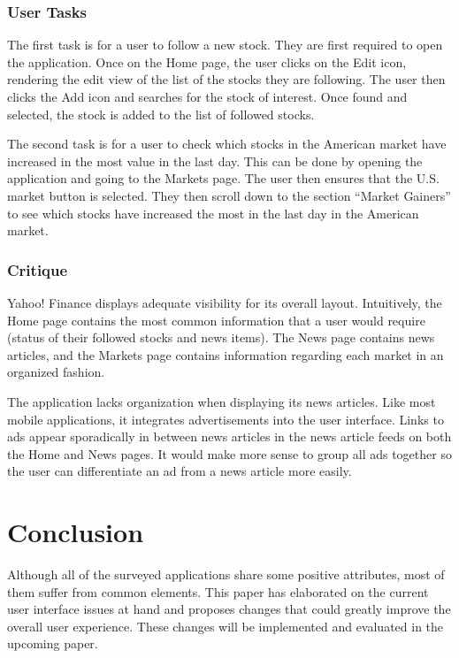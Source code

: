 \documentclass{sigchi}
\begin{document}
\subsubsection{User Tasks}
The first task is for a user to follow a new stock. They are first required to open the application. Once on the Home page, the user clicks on the Edit icon, rendering the edit view of the list of the stocks they are following. The user then clicks the Add icon and searches for the stock of interest. Once found and selected, the stock is added to the list of followed stocks.\par

The second task is for a user to check which stocks in the American market have increased in the most value in the last day. This can be done by opening the application and going to the Markets page. The user then ensures that the U.S. market button is selected. They then scroll down to the section ``Market Gainers'' to see which stocks have increased the most in the last day in the American market.


\subsubsection{Critique}
Yahoo! Finance displays adequate visibility for its overall layout. Intuitively, the Home page contains the most common information that a user would require (status of their followed stocks and news items). The News page contains news articles, and the Markets page contains information regarding each market in an organized fashion. \par

The application lacks organization when displaying its news articles. Like most mobile applications, it integrates advertisements into the user interface. Links to ads appear sporadically in between news articles in the news article feeds on both the Home and News pages. It would make more sense to group all ads together so the user can differentiate an ad from a news article more easily. 


\section{Conclusion}
Although all of the surveyed applications share some positive attributes, most of them suffer from common elements. This paper has elaborated on the current user interface issues at hand and proposes changes that could greatly improve the overall user experience. These changes will be implemented and evaluated in the upcoming paper. 
\end{document}

